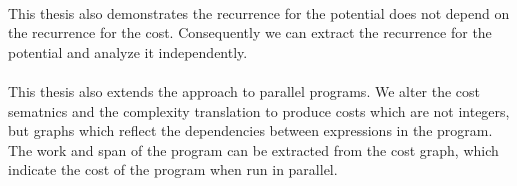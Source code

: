 \paragraph{}
This thesis also demonstrates the recurrence for the potential does not depend on the recurrence for the cost. Consequently we can extract the recurrence for the potential and analyze it independently.

\paragraph{}
This thesis also extends the \citet{Danner2015} approach to parallel programs. We alter the cost sematnics and the complexity translation to produce costs which are not integers, but graphs which reflect the dependencies between expressions in the program. The work and span of the program can be extracted from the cost graph, which indicate the cost of the program when run in parallel.
